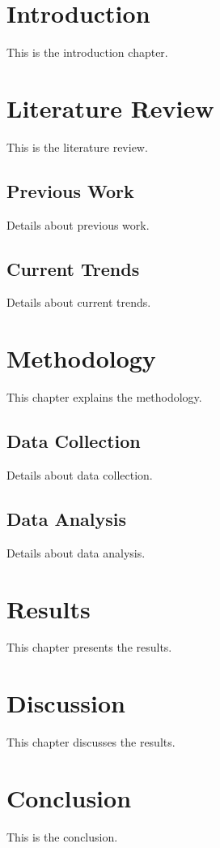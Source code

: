 \documentclass{book}
\begin{document}
\chapter{Introduction}
This is the introduction chapter.

{
	\chapter{Literature Review}
	This is the literature review.
	\section{Previous Work}
	Details about previous work.
	\section{Current Trends}
	Details about current trends.
}

{
\chapter{Methodology}
	This chapter explains the methodology.
	\section{Data Collection}
	Details about data collection.
	\section{Data Analysis}
	Details about data analysis.
	}

	\chapter{Results}
	This chapter presents the results.

	\chapter{Discussion}
	This chapter discusses the results.

	\chapter{Conclusion}
	This is the conclusion.

	
\end{document}
